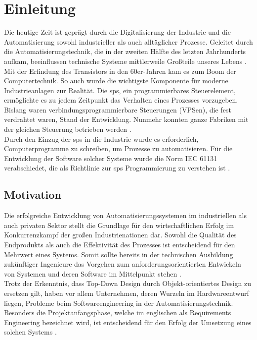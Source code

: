 \documentclass[../../Bachelorarbeit.tex]{subfiles}
\begin{document}
\section{Einleitung}


Die heutige Zeit ist geprägt durch die Digitalisierung der Industrie und die Automatisierung sowohl industrieller als auch alltäglicher Prozesse. Geleitet durch die Automatisierungstechnik, die in der zweiten Hälfte des letzten Jahrhunderts aufkam, beeinflussen technische Systeme mittlerweile Großteile unseres Lebens \cite[10]{Abolhassan2016}.\\
Mit der Erfindung des Transistors in den 60er-Jahren kam es zum Boom der Computertechnik. So auch wurde die wichtigste Komponente für moderne Industrieanlagen zur Realität. Die \ac{sps}, ein programmierbares Steuerelement, ermöglichte es zu jedem Zeitpunkt das Verhalten eines Prozesses vorzugeben. Bislang waren verbindungsprogrammierbare Steuerungen (VPSen), die fest verdrahtet waren, Stand der Entwicklung. Nunmehr konnten ganze Fabriken mit der gleichen Steuerung betrieben werden \cite[326]{Heinrich2019}.\\
Durch den Einzug der \acs{sps} in die Industrie wurde es erforderlich, Computerprogramme zu schreiben, um Prozesse zu automatisieren. Für die Entwicklung der Software solcher Systeme wurde die Norm IEC 61131 verabschiedet, die als Richtlinie zur \acs{sps} Programmierung zu verstehen ist \cite{Commission1998}.

\subsection{Motivation}
Die erfolgreiche Entwicklung von Automatisierungssystemen im industriellen als auch privaten Sektor stellt die Grundlage für den wirtschaftlichen Erfolg im Konkurrenzkampf der großen Industrienationen dar. Sowohl die Qualität des Endprodukts als auch die Effektivität des Prozesses ist entscheidend für den Mehrwert eines Systems. Somit sollte bereits in der technischen Ausbildung zukünftiger Ingenieure das Vorgehen zum anforderungsorientierten Entwickeln von Systemen und deren Software im Mittelpunkt stehen \cite[V]{Andelfinger2017}.\\
Trotz der Erkenntnis, dass Top-Down Design durch Objekt-orientiertes Design zu ersetzen gilt, haben vor allem Unternehmen, deren Wurzeln im Hardwareentwurf liegen, Probleme beim Softwareengineering in der Automatisierungstechnik. Besonders die Projektanfangsphase, welche im englischen als Requirements Engineering bezeichnet wird, ist entscheidend für den Erfolg der Umsetzung eines solchen Systems \cite[1]{Laplante2014}.
\end{document}
